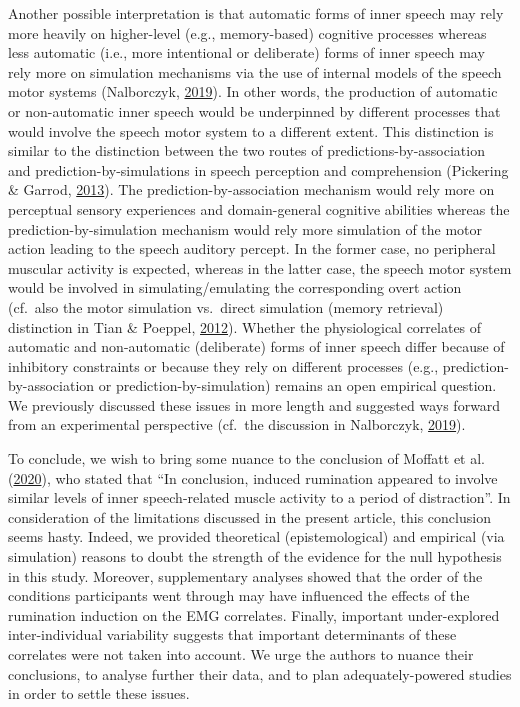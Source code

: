 \documentclass[
  english,
  man, donotrepeattitle,floatsintext]{apa6}
\begin{document}
Another possible interpretation is that automatic forms of inner speech may rely more heavily on higher-level (e.g., memory-based) cognitive processes whereas less automatic (i.e., more intentional or deliberate) forms of inner speech may rely more on simulation mechanisms via the use of internal models of the speech motor systems (Nalborczyk, \protect\hyperlink{ref-nalborczyk_understanding_2019}{2019}). In other words, the production of automatic or non-automatic inner speech would be underpinned by different processes that would involve the speech motor system to a different extent. This distinction is similar to the distinction between the two routes of predictions-by-association and prediction-by-simulations in speech perception and comprehension (Pickering \& Garrod, \protect\hyperlink{ref-pickering_integrated_2013}{2013}). The prediction-by-association mechanism would rely more on perceptual sensory experiences and domain-general cognitive abilities whereas the prediction-by-simulation mechanism would rely more simulation of the motor action leading to the speech auditory percept. In the former case, no peripheral muscular activity is expected, whereas in the latter case, the speech motor system would be involved in simulating/emulating the corresponding overt action (cf.~also the motor simulation vs.~direct simulation (memory retrieval) distinction in Tian \& Poeppel, \protect\hyperlink{ref-tian_mental_2012}{2012}). Whether the physiological correlates of automatic and non-automatic (deliberate) forms of inner speech differ because of inhibitory constraints or because they rely on different processes (e.g., prediction-by-association or prediction-by-simulation) remains an open empirical question. We previously discussed these issues in more length and suggested ways forward from an experimental perspective (cf.~the discussion in Nalborczyk, \protect\hyperlink{ref-nalborczyk_understanding_2019}{2019}).

To conclude, we wish to bring some nuance to the conclusion of Moffatt et al. (\protect\hyperlink{ref-moffatt_inner_2020}{2020}), who stated that ``In conclusion, induced rumination appeared to involve similar levels of inner speech-related muscle activity to a period of distraction''. In consideration of the limitations discussed in the present article, this conclusion seems hasty. Indeed, we provided theoretical (epistemological) and empirical (via simulation) reasons to doubt the strength of the evidence for the null hypothesis in this study. Moreover, supplementary analyses showed that the order of the conditions participants went through may have influenced the effects of the rumination induction on the EMG correlates. Finally, important under-explored inter-individual variability suggests that important determinants of these correlates were not taken into account. We urge the authors to nuance their conclusions, to analyse further their data, and to plan adequately-powered studies in order to settle these issues.
\end{document}
